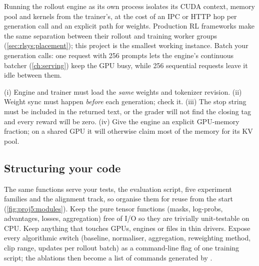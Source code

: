\begin{systemslens}
Running the rollout engine as its own process isolates its CUDA context, memory pool and kernels
from the trainer's, at the cost of an IPC or HTTP hop per generation call and an explicit path for
weights. Production RL frameworks make the same separation between their rollout and training
worker groups (\cref{sec:rlsys:placement}); this project is the smallest working instance. Batch
your generation calls: one request with 256 prompts lets the engine's continuous batcher
(\cref{ch:serving}) keep the GPU busy, while 256 sequential requests leave it idle between them.
\end{systemslens}

\begin{pitfall}
(i) Engine and trainer must load the \emph{same} weights and tokenizer revision. (ii) Weight sync
must happen \emph{before} each generation; check it. (iii) The stop string must be included in the
returned text, or the grader will not find the closing tag and every reward will be zero. (iv) Give
the engine an explicit GPU-memory fraction; on a shared GPU it will otherwise claim most of the
memory for its KV pool.
\end{pitfall}

\subsection{Structuring your code}\label{sec:proj5:structure}

The same functions serve your tests, the evaluation script, five experiment families and the
alignment track, so organise them for reuse from the start (\cref{fig:proj5:modules}). Keep the
pure tensor functions (masks, log-probs, advantages, losses, aggregation) free of I/O so they are
trivially unit-testable on CPU. Keep anything that touches GPUs, engines or files in thin drivers.
Expose every algorithmic switch (baseline, normaliser, aggregation, reweighting method, clip range,
updates per rollout batch) as a command-line flag of one training script; the ablations then become
a list of commands generated by .

